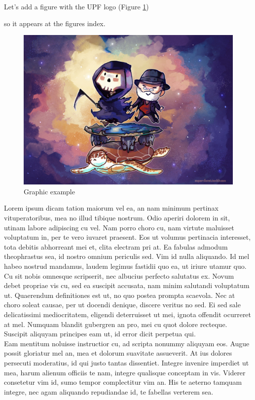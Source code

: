 Let's add a figure with the UPF logo  (Figure \ref{fig:terry_pratchett}) {so it appears at the figures index. 
\begin{figure}[h]
    \centering
    \includegraphics[scale=0.2]{images/terry_pratchett.jpg}
        \caption{Graphic example}
        \label{fig:terry_pratchett}
\end{figure}

Lorem ipsum dicam tation maiorum vel ea, an nam minimum pertinax vituperatoribus, mea no illud tibique nostrum. Odio aperiri dolorem in sit, utinam labore adipiscing cu vel. Nam porro choro cu, nam virtute maluisset voluptatum in, per te vero iuvaret praesent. Eos ut volumus pertinacia interesset, tota debitis abhorreant mei et, clita electram pri at. Ea fabulas admodum theophrastus sea, id nostro omnium periculis sed. Vim id nulla aliquando. Id mel habeo nostrud mandamus, laudem legimus fastidii quo ea, ut iriure utamur quo.\\

Cu sit nobis omnesque scripserit, nec albucius perfecto salutatus ex. Novum debet propriae vis cu, sed ea suscipit accusata, nam minim salutandi voluptatum ut. Quaerendum definitiones est ut, no quo postea prompta scaevola. Nec at choro soleat causae, per ut docendi denique, discere veritus no sed. Ei sed sale delicatissimi  mediocritatem, eligendi deterruisset ut mei, ignota offendit ocurreret at mel. Numquam blandit gubergren an pro, mei cu quot dolore recteque. Suscipit aliquyam principes eam ut, id error dicit perpetua qui.\\

Eam mentitum noluisse instructior cu, ad scripta nonummy aliquyam eos. Augue possit gloriatur mel an, mea et dolorum suavitate assueverit. At ius dolores persecuti moderatius, id qui justo tantas dissentiet. Integre invenire imperdiet ut mea, harum alienum officiis te nam, integre qualisque conceptam in vis. Viderer  consetetur vim id, sumo tempor complectitur vim an. His te aeterno tamquam integre, nec agam aliquando repudiandae id, te fabellas verterem sea.\\

}
